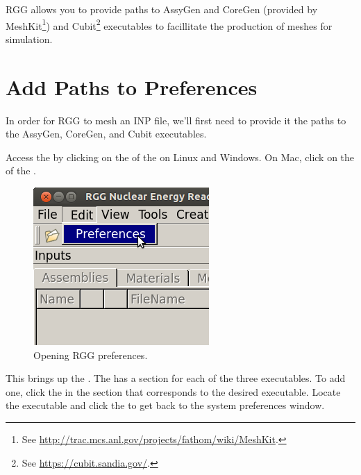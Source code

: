 RGG allows you to provide paths to AssyGen and CoreGen (provided by MeshKit\footnote{See \url{http://trac.mcs.anl.gov/projects/fathom/wiki/MeshKit}.}) and Cubit\footnote{See \url{https://cubit.sandia.gov/}.} executables to facillitate the production of meshes for simulation.

\section{Add Paths to Preferences}

In order for RGG to mesh an INP file, we'll first need to provide it the paths to the AssyGen, CoreGen, and Cubit executables.

Access the  by clicking on the  of the  on Linux and Windows.  On Mac, click on the  of the .

\begin{figure}[H]
	\begin{center}
		\includegraphics[width=0.5\linewidth]{Images/mesh-1.png}
		\caption{Opening RGG preferences.}
		\label{fig:Mesh1}
	\end{center}
\end{figure}

This brings up the .  The  has a section for each of the three executables.  To add one, click the  in the section that corresponds to the desired executable.  Locate the executable and click the  to get back to the system preferences window.

